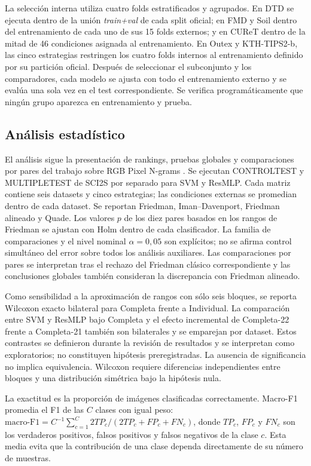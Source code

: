 \documentclass[a4paper,fleqn]{cas-sc}
\begin{document}
La selección interna utiliza cuatro folds estratificados y agrupados. En DTD se ejecuta dentro de la unión \emph{train+val} de cada split oficial; en FMD y Soil dentro del entrenamiento de cada uno de sus 15 folds externos; y en CUReT dentro de la mitad de 46 condiciones asignada al entrenamiento. En Outex y KTH-TIPS2-b, las cinco estrategias restringen los cuatro folds internos al entrenamiento definido por su partición oficial. Después de seleccionar el subconjunto y los comparadores, cada modelo se ajusta con todo el entrenamiento externo y se evalúa una sola vez en el test correspondiente. Se verifica programáticamente que ningún grupo aparezca en entrenamiento y prueba.



\subsection{Análisis estadístico}\label{sec:analisis-estadistico}

El análisis sigue la presentación de rankings, pruebas globales y comparaciones por pares del trabajo sobre RGB Pixel N-grams \citep{paiva2023rgb}. Se ejecutan CONTROLTEST y MULTIPLETEST de SCI2S por separado para SVM y ResMLP. Cada matriz contiene seis datasets y cinco estrategias; las condiciones externas se promedian dentro de cada dataset. Se reportan Friedman, Iman--Davenport, Friedman alineado y Quade. Los valores $p$ de los diez pares basados en los rangos de Friedman se ajustan con Holm dentro de cada clasificador. La familia de comparaciones y el nivel nominal $\alpha=0{,}05$ son explícitos; no se afirma control simultáneo del error sobre todos los análisis auxiliares. Las comparaciones por pares se interpretan tras el rechazo del Friedman clásico correspondiente y las conclusiones globales también consideran la discrepancia con Friedman alineado.

Como sensibilidad a la aproximación de rangos con sólo seis bloques, se reporta Wilcoxon exacto bilateral para Completa frente a Individual. La comparación entre SVM y ResMLP bajo Completa y el efecto incremental de Completa-22 frente a Completa-21 también son bilaterales y se emparejan por dataset. Estos contrastes se definieron durante la revisión de resultados y se interpretan como exploratorios; no constituyen hipótesis preregistradas. La ausencia de significancia no implica equivalencia. Wilcoxon requiere diferencias independientes entre bloques y una distribución simétrica bajo la hipótesis nula.

La exactitud es la proporción de imágenes clasificadas correctamente. Macro-F1 promedia el F1 de las $C$ clases con igual peso: $\mathrm{macro\mbox{-}F1}=C^{-1}\sum_{c=1}^{C}2TP_c/(2TP_c+FP_c+FN_c)$, donde $TP_c$, $FP_c$ y $FN_c$ son los verdaderos positivos, falsos positivos y falsos negativos de la clase $c$. Esta media evita que la contribución de una clase dependa directamente de su número de muestras.
\end{document}
